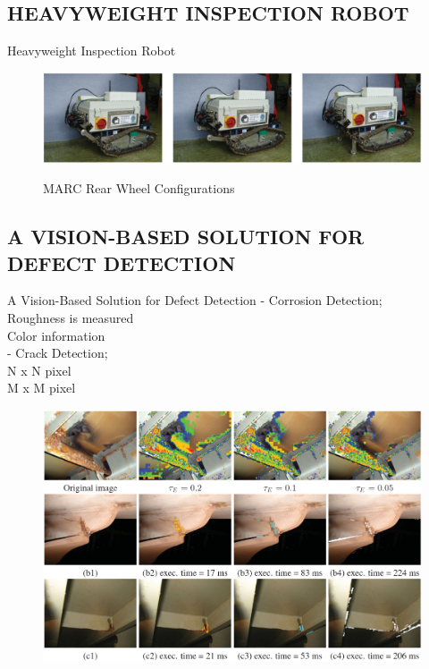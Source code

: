\documentclass{beamer}
\begin{document}
        \subsection{HEAVYWEIGHT INSPECTION ROBOT}

            \begin{frame}{Heavyweight Inspection Robot}
                 
                \begin{figure}[htb]
                    \centering
                    \includegraphics[scale=0.16]{figuras/MARC_rear_wheel_configurations.png}                   
                    \label{}
                    \caption{MARC Rear Wheel Configurations}
                \end{figure}           
            \end{frame}            

        \subsection{A VISION-BASED SOLUTION FOR DEFECT DETECTION}
            \begin{frame}{A Vision-Based Solution for Defect Detection}
                - Corrosion Detection; \\
                    Roughness is measured \\
                    Color information \\
                - Crack Detection; \\
                    N x N pixel \\
                    M x M pixel \\ 
                \begin{figure}[htb]
                    \hfill \includegraphics[scale=0.13]{figuras/corroded_aread_detected.png}                   
                    \label{}
                \end{figure}  
            \end{frame}        
\end{document}
